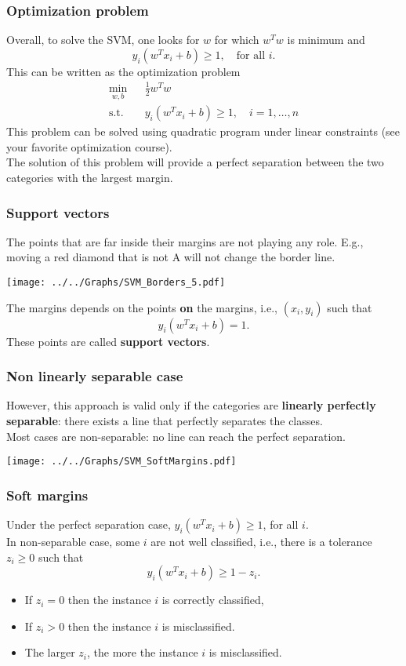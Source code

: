 \begin{frame}
\frametitle{Optimization problem}
Overall, to solve the SVM, one looks for $w$ for which $w^Tw$ is minimum and 
$$
y_i (w^T x_i + b) \geq 1, \quad \mbox{for all } i.
$$
This can be written as the optimization problem
\begin{eqnarray*}
\min_{w, b} && \frac{1}{2}w^Tw  \\
\mbox{s.t. } && y_i(w^Tx_i + b) \geq 1, \quad i=1,\ldots ,n
\end{eqnarray*}
This problem can be solved using quadratic program under linear constraints (see your favorite optimization course).\\
\vspace{0.2cm}
The solution of this problem will provide a perfect separation between the two categories with the largest margin.
\end{frame}
\begin{frame}
\frametitle{Support vectors}
The points that are far inside their margins are not playing any role. E.g., moving a red diamond that is not A will not change the border line.
\begin{center}
\texttt{[image: ../../Graphs/SVM\_Borders\_5.pdf]}
\end{center}
The margins depends on the points {\bf on} the margins, i.e., $(x_i,y_i)$ such that 
$$
y_i(w^T x_i + b) = 1.$$
These points are called {\bf support vectors}.
\end{frame}
\begin{frame}
\frametitle{Non linearly separable case}
However, this approach is valid only if the categories are {\bf linearly perfectly separable}: there exists a line that perfectly separates the classes.\\
\vspace{0.3cm}
Most cases are non-separable: no line can reach the perfect separation.
\begin{center}
\texttt{[image: ../../Graphs/SVM\_SoftMargins.pdf]}
\end{center}
\end{frame}
\begin{frame}
\frametitle{Soft margins}
Under the perfect separation case, $y_i(w^Tx_i + b) \geq 1$, for all $i$.\\
\vspace{0.3cm}
In non-separable case, some $i$ are not well classified, i.e., there is a tolerance $z_i\geq 0$ such that
$$
y_i(w^Tx_i + b) \geq 1 - z_i.
$$
\begin{itemize}
\item If $z_i=0$ then the instance $i$ is correctly classified,
\item If $z_i>0$ then the instance $i$ is misclassified. 
\item The larger $z_i$, the more the instance $i$ is misclassified.
\end{itemize}
\end{frame}
